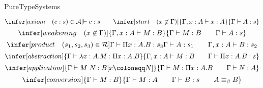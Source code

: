\begin{entry}{PureTypeSystems}


\newcommand{\sorts}{\mathcal{S}}
\newcommand{\axioms}{\mathcal{A}}
\newcommand{\rules}{\mathcal{R}}
\newcommand{\variables}{\mathcal{V}}
\newcommand{\constants}{\mathcal{C}}
\newcommand{\terms}{\mathcal{T}}

\newcommand{\union}{\cup}

\newcommand{\Prop}{\ast}
\newcommand{\Type}{\square}
\newcommand{\Kind}{\triangle}

\newcommand{\entails}{\vdash}

\newcommand{\negvspace}{\vspace{-1ex}}

\begin{calculus}

\negvspace
\[ \infer[axiom\quad (c : s) \in \axioms]{\entails c : s}{ } \qquad
   \infer[start\quad (x \not\in \Gamma)]{\Gamma, x : A \entails x : A}{\Gamma \entails A : s} \]
\[ \infer[weakening\quad (x\not\in\Gamma)]{\Gamma, x : A \entails M : B}{\Gamma \entails M : B \qquad \Gamma \entails A : s} \]
\[ \infer[product\quad (s_1,s_2,s_3)\in\rules]{\Gamma \entails \Pi x : A. B : s_3}{\Gamma \entails A : s_1 \qquad \Gamma, x : A \entails B : s_2} \]
\[ \infer[abstraction]{\Gamma \entails \lambda x: A. M : \Pi x : A. B}{\Gamma, x : A \entails M : B \qquad \Gamma \entails \Pi x : A. B : s} \]
\[ \infer[application]{\Gamma \entails M~N : B[x \coloneqq N]}{\Gamma \entails M : \Pi x : A. B \qquad \Gamma \entails N : A} \]
\[ \infer[conversion]{\Gamma \entails M : B}{\Gamma \entails M : A \qquad \Gamma \entails B : s \qquad A \equiv_\beta B} \]

\vspace{5pt}

\end{calculus}



\end{entry}
